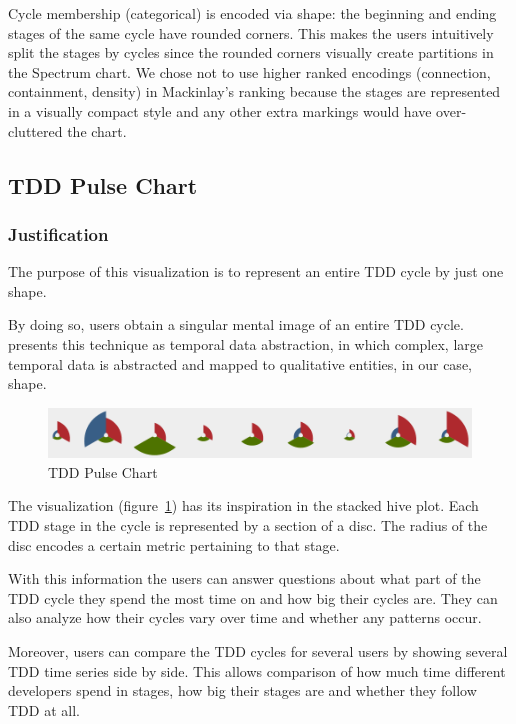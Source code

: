 \documentclass[journal]{vgtc}                %
\begin{document}
Cycle membership (categorical) is encoded via shape: the beginning and ending stages of the same cycle have rounded corners.
This makes the users intuitively split the stages by cycles since the rounded corners visually create partitions in the Spectrum chart.
We chose not to use higher ranked encodings (connection, containment, density) in Mackinlay's ranking because the stages are represented in a visually compact style and any other extra markings would have over-cluttered the chart.

\subsection{TDD Pulse Chart}
\label{sec:pulse}

\subsubsection{Justification}

The purpose of this visualization is to represent an entire TDD cycle by just one shape. 

By doing so, users obtain a singular mental image of an entire TDD cycle.
\cite{one} presents this technique as temporal data abstraction, in which complex, large temporal data is abstracted and mapped to qualitative entities, in our case, shape.

\begin{figure}
	\includegraphics[width=\textwidth]{fig3.png}
	\caption{TDD Pulse Chart}
	\label{fig:three}
\end{figure}

The visualization (figure~\ref{fig:three}) has its inspiration in the stacked hive plot.
Each TDD stage in the cycle is represented by a section of a disc.
The radius of the disc encodes a certain metric pertaining to that stage.

With this information the users can answer questions about what part of the TDD cycle they spend the most time on and how big their cycles are. They can also analyze how their cycles vary over time and whether any patterns occur.

Moreover, users can compare the TDD cycles for several users by showing several TDD time series side by side. This allows comparison of how much time different developers spend in stages, how big their stages are and whether they follow TDD at all.
\end{document}
